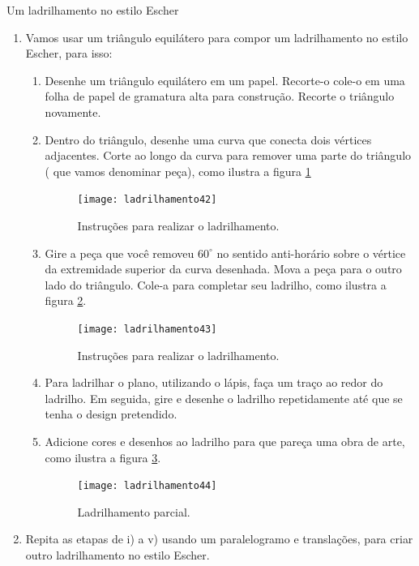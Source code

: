 \begin{task}{Um ladrilhamento no estilo Escher}\label{at_outros3}
\begin{enumerate}
\item Vamos usar um triângulo equilátero para compor um ladrilhamento no estilo Escher, para isso:  
\begin{enumerate}

	\item Desenhe um triângulo equilátero em um papel. Recorte-o  cole-o em uma folha de papel de gramatura alta para construção. Recorte o triângulo novamente.

	\item Dentro do triângulo, desenhe uma curva que conecta dois vértices adjacentes. Corte ao longo da curva para remover uma parte do triângulo ( que vamos denominar peça), como ilustra a figura \ref{escher1}

	\begin{figure}[H]
	\centering
	\texttt{[image: ladrilhamento42]}
\label{escher1}
\caption{Instruções para realizar o ladrilhamento.}
	\end{figure}

	\item Gire a peça que você removeu $60^{\circ}$ no sentido anti-horário sobre o vértice da extremidade superior da curva desenhada. Mova a peça para o outro lado do triângulo. Cole-a para completar seu ladrilho, como ilustra a figura \ref{escher2}.

	\begin{figure}[H]
	\centering
	\texttt{[image: ladrilhamento43]}
	\label{escher2}
\caption{Instruções para realizar o ladrilhamento.}

	\end{figure}

	\item Para ladrilhar o plano, utilizando o lápis, faça um traço ao redor do ladrilho. Em seguida, gire e desenhe o ladrilho repetidamente até que se tenha o design pretendido.
	\item Adicione cores e desenhos ao ladrilho para que pareça uma obra de arte, como ilustra a figura \ref{escher3}.

	\begin{figure}[H]
	\centering
	\texttt{[image: ladrilhamento44]}
	\label{escher3}
\caption{Ladrilhamento parcial.}
	\end{figure}
\end{enumerate}

	\item Repita as etapas de i) a v) usando um paralelogramo e translações, para criar outro ladrilhamento no estilo Escher.

\end{enumerate}
\end{task}




